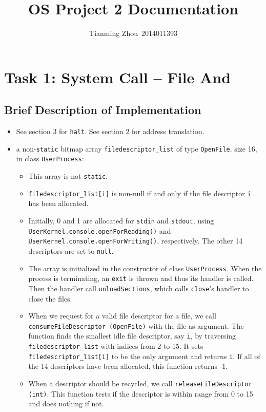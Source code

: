\documentclass{article}
\title{OS Project 2 Documentation}
\author{Tianming Zhou\ 2014011393}
\begin{document}
\maketitle \thispagestyle{empty}

\section{Task 1: System Call -- File And }

\subsection{Brief Description of Implementation}

\begin{itemize}
\item See section 3 for \texttt{halt}. See section 2 for address translation.
\item 
a non-\texttt{static} bitmap array \texttt{filedescriptor\_list} of type \texttt{OpenFile}, size 16, in class \texttt{UserProcess}:
\begin{itemize}
\item
This array is not \texttt{static}.
\item
\texttt{filedescriptor\_list[i]} is non-null if and only if the file descriptor \texttt i has been allocated.
\item
Initially, 0 and 1 are allocated for \texttt{stdin} and \texttt{stdout}, using \texttt{UserKernel.console.openForReading()} and \texttt{UserKernel.console.openForWriting()}, respectively.
The other 14 descriptors are set to \texttt{null}.
\item
The array is initialized in the constructor of class \texttt{UserProcess}.
When the process is terminating, an \texttt{exit} is thrown and thus its handler is called.
Then the handler call \texttt{unloadSections}, which calls \texttt{close}'s handler to close the files.
\item
When we request for a valid file descriptor for a file, we call \texttt{consumeFileDescriptor (OpenFile)} with the file as argument.
The function finds the smallest idle file descriptor, say \texttt i, by traversing \texttt{filedescriptor\_list} with indices from 2 to 15.
It sets \texttt{filedescriptor\_list[i]} to be the only argument and returns \texttt i.
If all of the 14 descriptors have been allocated, this function returns -1.
\item
When a descriptor should be recycled, we call \texttt{releaseFileDescriptor (int)}.
This function tests if the descriptor is within range from 0 to 15 and does nothing if not.

\end{itemize}
\end{itemize}
\end{document}
